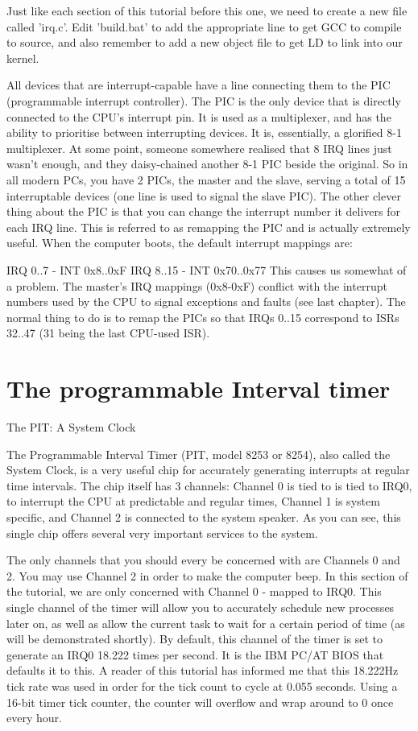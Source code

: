 \documentclass[11pt]{article}
\begin{document}
Just like each section of this tutorial before this one, we need to create a new file called 'irq.c'. Edit 'build.bat' to add the appropriate line to get GCC to compile to source, and also remember to add a new object file to get LD to link into our kernel.

All devices that are interrupt-capable have a line connecting them to the PIC (programmable interrupt controller). The PIC is the only device that is directly connected to the CPU's interrupt pin. It is used as a multiplexer, and has the ability to prioritise between interrupting devices. It is, essentially, a glorified 8-1 multiplexer. At some point, someone somewhere realised that 8 IRQ lines just wasn't enough, and they daisy-chained another 8-1 PIC beside the original. So in all modern PCs, you have 2 PICs, the master and the slave, serving a total of 15 interruptable devices (one line is used to signal the slave PIC).
The other clever thing about the PIC is that you can change the interrupt number it delivers for each IRQ line. This is referred to as remapping the PIC and is actually extremely useful. When the computer boots, the default interrupt mappings are:

IRQ 0..7 - INT 0x8..0xF
IRQ 8..15 - INT 0x70..0x77
This causes us somewhat of a problem. The master's IRQ mappings (0x8-0xF) conflict with the interrupt numbers used by the CPU to signal exceptions and faults (see last chapter). The normal thing to do is to remap the PICs so that IRQs 0..15 correspond to ISRs 32..47 (31 being the last CPU-used ISR).

\section {The programmable Interval timer}

The PIT: A System Clock

The Programmable Interval Timer (PIT, model 8253 or 8254), also called the System Clock, is a very useful chip for accurately generating interrupts at regular time intervals. The chip itself has 3 channels: Channel 0 is tied to is tied to IRQ0, to interrupt the CPU at predictable and regular times, Channel 1 is system specific, and Channel 2 is connected to the system speaker. As you can see, this single chip offers several very important services to the system.

The only channels that you should every be concerned with are Channels 0 and 2. You may use Channel 2 in order to make the computer beep. In this section of the tutorial, we are only concerned with Channel 0 - mapped to IRQ0. This single channel of the timer will allow you to accurately schedule new processes later on, as well as allow the current task to wait for a certain period of time (as will be demonstrated shortly). By default, this channel of the timer is set to generate an IRQ0 18.222 times per second. It is the IBM PC/AT BIOS that defaults it to this. A reader of this tutorial has informed me that this 18.222Hz tick rate was used in order for the tick count to cycle at 0.055 seconds. Using a 16-bit timer tick counter, the counter will overflow and wrap around to 0 once every hour.
\end{document}
